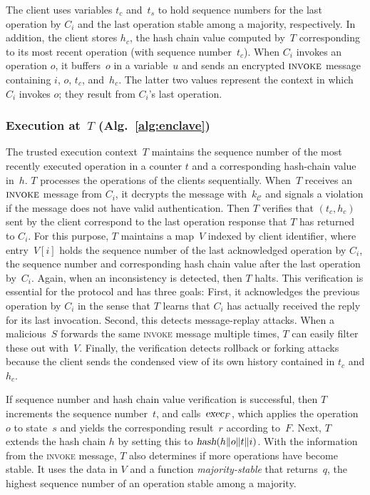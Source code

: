 \documentclass[11pt]{article}
\theoremstyle{plain-boldhead}
\theoremstyle{definition-boldhead}
\newcommand{\str}[1]{\textsc{#1}}
\newcommand{\op}[1]{\textsl{#1}}
\newcommand{\CC}{\ensuremath{\mathcal{C}}\xspace}
\begin{document}
The client uses variables $t_c$ and~$t_s$ to hold sequence
numbers for the last operation by $C_i$ and the last operation stable among
a majority, respectively.  In addition, the client stores $h_c$, the hash
chain value computed by~$T$ corresponding to its most recent operation
(with sequence number~$t_c$).
% 
When $C_i$ invokes an operation $o$, it buffers~$o$ in a variable~$u$ and
sends an encrypted $\str{invoke}$ message containing $i$, $o$, $t_c$,
and~$h_c$.  The latter two values represent the context in which~$C_i$
invokes $o$; they result from $C_i$'s last operation.

\subsubsection{Execution at~$T$ (Alg.~\ref{alg:enclave})}

The trusted execution context~$T$ maintains the sequence number of the most
recently executed operation in a counter $t$ and a corresponding hash-chain
value in~$h$.
% 
$T$ processes the operations of the clients sequentially. When~$T$ receives an
$\str{invoke}$ message from $C_i$, it decrypts the message with~$k_{\CC}$ and
signals a violation if the message does not have valid authentication.  Then
$T$ verifies that $(t_c, h_c)$ sent by the client correspond to the last
operation response that $T$ has returned to $C_i$.  For this purpose, $T$
maintains a map~$V$ indexed by client identifier, where entry~$V[i]$ holds the
sequence number of the last acknowledged operation by $C_i$, the
sequence number and corresponding hash chain value after the last operation
by~$C_i$. Again, when an inconsistency is detected, then $T$ halts.
% 
This verification is essential for the protocol and has three goals:
% 
First, it acknowledges the previous operation by $C_i$ in the sense that
$T$ learns that $C_i$ has actually received the reply for its last
invocation.
% 
Second, this detects message-replay attacks.  When a malicious~$S$
forwards the same \str{invoke} message multiple times, $T$ can easily
filter these out with~$V$.
% 
Finally, the verification detects rollback or forking attacks
because the client sends the condensed view of its own history contained in
$t_c$ and $h_c$.

If sequence number and hash chain value verification is successful, then $T$
increments the sequence number~$t$, and calls~$\op{exec}_F$, which applies the
operation~$o$ to state~$s$ and yields the corresponding result~$r$ according
to~$F$. Next, $T$ extends the hash chain $h$ by setting this to $\op{hash}(h
\| o \| t \| i)$.
%
With the information from the \str{invoke} message, $T$ also determines if
more operations have become stable.  It uses the data in $V$ and a function
\op{majority-stable} that returns~$q$, the highest sequence number of an
operation stable among a majority.
\end{document}
